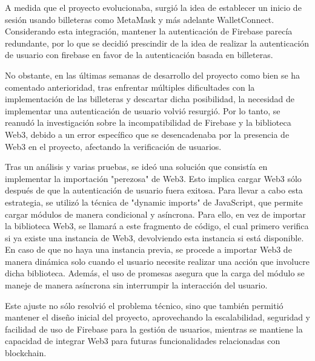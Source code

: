 A medida que el proyecto evolucionaba, surgió la idea de establecer un inicio de sesión usando billeteras como MetaMask y más adelante WalletConnect. Considerando esta integración, mantener la autenticación de Firebase parecía redundante, por lo que se decidió prescindir de la idea de realizar la autenticación de usuario con firebase en favor de la autenticación basada en billeteras.
 
No obstante, en las últimas semanas de desarrollo del proyecto como bien se ha comentado anterioridad, tras enfrentar múltiples dificultades con la implementación de las billeteras y descartar dicha posibilidad, la necesidad de implementar una autenticación de usuario volvió resurgió.
Por lo tanto, se reanudó la investigación sobre la incompatibilidad de Firebase y la biblioteca Web3, debido a un error específico que se desencadenaba por la presencia de Web3 en el proyecto, afectando la verificación de usuarios.

Tras un análisis y varias pruebas, se ideó una solución que consistía en implementar la importación "perezosa" de Web3. Esto implica cargar Web3 sólo después de que la autenticación de usuario fuera exitosa. Para llevar a cabo esta estrategia, se utilizó la técnica de "dynamic imports" de JavaScript, que permite cargar módulos de manera condicional y asíncrona. 
Para ello, en vez de importar la biblioteca Web3, se llamará a este fragmento de código, el cual primero verifica si ya existe una instancia de Web3, devolviendo esta instancia si está disponible. En caso de que no haya una instancia previa, se procede a importar Web3 de manera dinámica solo cuando el usuario necesite realizar una acción que involucre dicha biblioteca.
Además, el uso de promesas asegura que la carga del módulo se maneje de manera asíncrona  sin interrumpir la interacción del usuario.


Este ajuste no sólo resolvió el problema técnico, sino que también permitió mantener el diseño inicial del proyecto, aprovechando la escalabilidad, seguridad y facilidad de uso de Firebase para la gestión de usuarios, mientras se mantiene la capacidad de integrar Web3 para futuras funcionalidades relacionadas con blockchain.